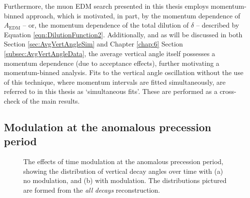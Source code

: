 Furthermore, the muon EDM search presented in this thesis employs momentum-binned approach, which is motivated, in part, by the momentum dependence of $A_{\text{EDM}}$ -- or, the momentum dependence of the total dilution of $\delta$ -- described by Equation \ref{eqn:DilutionFunction2}. Additionally, and as will be discussed in both Section \ref{sec:AvgVertAngleSim} and Chapter \ref{chap:6} Section \ref{subsec:AvgVertAngleData}, the average vertical angle itself possesses a momentum dependence (due to acceptance effects), further motivating a momentum-binned analysis. Fits to the vertical angle oscillation without the use of this technique, where momentum intervals are fitted simultaneously, are referred to in this thesis as `simultaneous fits'. These are performed as a cross-check of the main results. 

\subsection{Modulation at the anomalous precession period}\label{sec:TimeMod}

\begin{figure}[b!]
\centering{}
\caption{The effects of time modulation at the anomalous precession period, showing the distribution of vertical decay angles over time with (a) no modulation, and (b) with modulation. The distributions pictured are formed from the \textit{all decays} reconstruction.}
\label{fig:TimeModulation}
\end{figure}  

